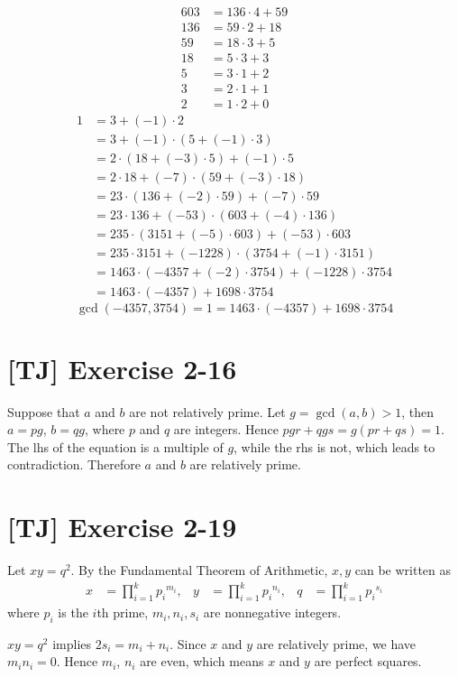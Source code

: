 \documentclass[a4paper,11pt,twocolumn]{article}
\begin{document}
\begin{enumerate}[(a)]
\begin{align*}
          603 &= 136 \cdot 4 + 59 \\
          136 &= 59 \cdot 2 + 18 \\
          59 &= 18 \cdot 3 + 5 \\
          18 &= 5 \cdot 3 + 3 \\
          5 &= 3 \cdot 1 + 2 \\
          3 &= 2 \cdot 1 + 1 \\
          2 &= 1 \cdot 2 + 0
        \end{align*}
        \begin{align*}
          1 &= 3 + (-1) \cdot 2 \\
            &= 3 + (-1) \cdot (5 + (-1) \cdot 3) \\
            &= 2 \cdot (18 + (-3) \cdot 5) + (-1) \cdot 5 \\
            &= 2 \cdot 18 + (-7) \cdot (59 + (-3) \cdot 18) \\
            &= 23 \cdot (136 + (-2) \cdot 59) + (-7) \cdot 59 \\
            &= 23 \cdot 136 + (-53) \cdot (603 + (-4) \cdot 136) \\
            &= 235 \cdot (3151 + (-5) \cdot 603) + (-53) \cdot 603 \\
            &= 235 \cdot 3151 + (-1228) \cdot (3754 + (-1) \cdot 3151) \\
            &= 1463 \cdot (-4357 + (-2) \cdot 3754) + (-1228) \cdot 3754 \\
            &= 1463 \cdot (-4357) + 1698 \cdot 3754
        \end{align*}
        $$ \gcd(-4357, 3754) = 1 = 1463 \cdot (-4357) + 1698 \cdot 3754 $$
  \end{enumerate}

  \section{[TJ] Exercise 2-16}
  Suppose that $a$ and $b$ are not relatively prime. Let $g = \gcd(a, b) > 1$, then $a = pg$, $b = qg$, where $p$ and $q$ are integers. Hence $pgr + qgs = g(pr + qs) = 1$. The lhs of the equation is a multiple of $g$, while the rhs is not, which leads to contradiction. Therefore $a$ and $b$ are relatively prime.

  \section{[TJ] Exercise 2-19}
  Let $xy = q^2$. By the Fundamental Theorem of Arithmetic, $x, y$ can be written as
  \begin{align*}
    x &= \prod_{i=1}^{k} {p_i}^{m_i},  &  y &= \prod_{i=1}^{k} {p_i}^{n_i}, & q &= \prod_{i=1}^{k} {p_i}^{s_i}
  \end{align*}
  where $p_i$ is the $i$th prime, $m_i, n_i, s_i$ are nonnegative integers. \par
  $xy = q^2$ implies $2s_i = m_i + n_i$. Since $x$ and $y$ are relatively prime, we have $m_i n_i = 0$. Hence $m_i$, $n_i$ are even, which means $x$ and $y$ are perfect squares.
\end{document}
